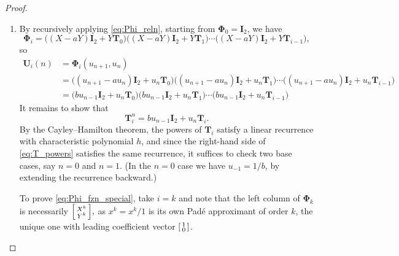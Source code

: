 \documentclass{article}
\numberwithin{equation}{section}
\theoremstyle{definition}
\theoremstyle{remark}
\newcommand{\<}{\left\langle}
\renewcommand{\>}{\right\rangle}
\begin{document}
\begin{proof}
\begin{enumerate}[label=\textup{(\alph*)}]
    \item
    By recursively applying \eqref{eq:Phi_reln}, starting from $\boldsymbol{\Phi}_0 = \mathbf{I}_2$, we have
    \begin{equation}
      \boldsymbol{\Phi}_i = \big((X - a Y) \mathbf{I}_2 + Y \mathbf{T}_0\big)\big((X - a Y) \mathbf{I}_2 + Y \mathbf{T}_1\big) \cdots \big((X - a Y) \mathbf{I}_2 + Y \mathbf{T}_{i-1} \big),
    \end{equation}
    so
    \begin{equation}
      \begin{aligned}
        \mathbf{U}_i(n) &= \boldsymbol{\Phi}_i\left(u_{n+1}, u_n\right) \\
        &= \big((u_{n+1} - a u_n) \mathbf{I}_2 + u_n \mathbf{T}_0\big)\big((u_{n+1} - a u_n) \mathbf{I}_2 + u_n \mathbf{T}_1\big) \cdots \big((u_{n+1} - a u_n) \mathbf{I}_2 + u_n \mathbf{T}_{i - 1}\big) \\
        &= \big(b u_{n-1} \mathbf{I}_2 + u_n \mathbf{T}_0\big) \big(b u_{n-1} \mathbf{I}_2 + u_n \mathbf{T}_1\big) \cdots \big(b u_{n-1} \mathbf{I}_2 + u_n \mathbf{T}_{i-1}\big)
      \end{aligned}
    \end{equation}
    It remains to show that
    \begin{equation} \label{eq:T_powers}
      \mathbf{T}_i^n = b u_{n-1}\mathbf{I}_2 + u_n \mathbf{T}_i.
    \end{equation}
    By the Cayley--Hamilton theorem, the powers of $\mathbf{T}_i$ satisfy a linear recurrence with characteristic polynomial $h$, and since the right-hand side of \eqref{eq:T_powers} satisfies the same recurrence, it suffices to check two base cases, say $n = 0$ and $n = 1$. (In the $n = 0$ case we have $u_{-1} = 1/b$, by extending the recurrence backward.)

    To prove \eqref{eq:Phi_fzn_special}, take $i = k$ and note that the left column of $\boldsymbol{\Phi}_k$ is necessarily $\begin{bsmallmatrix}
      X^k \\ Y^k
    \end{bsmallmatrix},$ as $x^k = x^k/1$ is its own Pad\'e approximant of order $k$, the unique one with leading coefficient vector $\begin{bsmallmatrix}
      1 \\ 0
    \end{bsmallmatrix}$.
    \qedhere
  \end{enumerate}
\end{proof}
\end{document}
